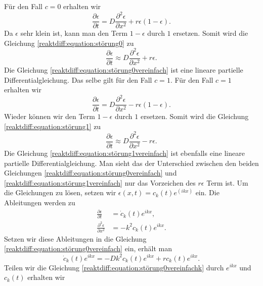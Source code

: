 Für den Fall \(c = 0\) erhalten wir
\begin{equation}
\label{reaktdiff:equation:störung0}
\frac{\partial \epsilon}{\partial t} = D \frac{\partial^2 \epsilon}{\partial x^2} + r\epsilon(1-\epsilon).
\end{equation}
Da \(\epsilon\) sehr klein ist, kann man den Term \(1-\epsilon\) durch \(1\) ersetzen.
Somit wird die Gleichung \ref{reaktdiff:equation:störung0} zu
\begin{equation}
\label{reaktdiff:equation:störung0vereinfach}
\frac{\partial \epsilon}{\partial t} \approx D \frac{\partial^2 \epsilon}{\partial x^2}  + r\epsilon.
\end{equation}
Die Gleichung \ref{reaktdiff:equation:störung0vereinfach} ist eine lineare partielle Differentialgleichung.
Das selbe gilt für den Fall \(c = 1\).
Für den Fall \(c = 1\) erhalten wir
\begin{equation}
\label{reaktdiff:equation:störung1}
\frac{\partial \epsilon}{\partial t} = D \frac{\partial^2 \epsilon}{\partial x^2} - r\epsilon(1-\epsilon).
\end{equation}
Wieder können wir den Term \(1-\epsilon\) durch \(1\) ersetzen.
Somit wird die Gleichung \ref{reaktdiff:equation:störung1} zu
\begin{equation}
\label{reaktdiff:equation:störung1vereinfach}
\frac{\partial \epsilon}{\partial t} \approx D \frac{\partial^2 \epsilon}{\partial x^2} - r\epsilon.
\end{equation}
Die Gleichung \ref{reaktdiff:equation:störung1vereinfach} ist ebenfalls eine lineare partielle Differentialgleichung.
Man sieht das der Unterschied zwischen den beiden Gleichungen \ref{reaktdiff:equation:störung0vereinfach} und \ref{reaktdiff:equation:störung1vereinfach} nur das Vorzeichen des \(r\epsilon\) Term ist.
Um die Gleichungen zu lösen, setzen wir \(\epsilon(x,t) = c_k(t) e^(ikx)\) ein.
Die Ableitungen werden zu
\begin{align*}
\frac{\partial \epsilon}{\partial t} &= \dot{c}_k(t) e^{ikx},\\
\frac{\partial^2 \epsilon}{\partial x^2} &= -k^2 c_k(t) e^{ikx}.
\end{align*}
Setzen wir diese Ableitungen in die Gleichung \ref{reaktdiff:equation:störung0vereinfach} ein, erhält man
\begin{equation}
\label{reaktdiff:equation:störung0vereinfachk}
\dot{c}_k(t) e^{ikx} = -D k^2 c_k(t) e^{ikx} + r c_k(t) e^{ikx}.
\end{equation}
Teilen wir die Gleichung \ref{reaktdiff:equation:störung0vereinfachk} durch \(e^{ikx}\) und \(c_k(t)\) erhalten wir
